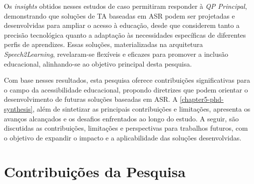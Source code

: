 Os \textit{insights} obtidos nesses estudos de caso permitiram responder à \textit{QP Principal}, demonstrando que soluções de TA baseadas em ASR podem ser projetadas e desenvolvidas para ampliar o acesso à educação, desde que considerem tanto a precisão tecnológica quanto a adaptação às necessidades específicas de diferentes perfis de aprendizes. Essas soluções, materializadas na arquitetura \textit{Speech2Learning}, revelaram-se flexíveis e eficazes para promover a inclusão educacional, alinhando-se ao objetivo principal desta pesquisa.

Com base nesses resultados, esta pesquisa oferece contribuições significativas para o campo da acessibilidade educacional, propondo diretrizes que podem orientar o desenvolvimento de futuras soluções baseadas em ASR. A \autoref{chapter5-phd-synthesis}, além de sintetizar as principais contribuições e limitações, apresenta os avanços alcançados e os desafios enfrentados ao longo do estudo. A seguir, são discutidas as contribuições, limitações e perspectivas para trabalhos futuros, com o objetivo de expandir o impacto e a aplicabilidade das soluções desenvolvidas.


\section{Contribuições da Pesquisa}



